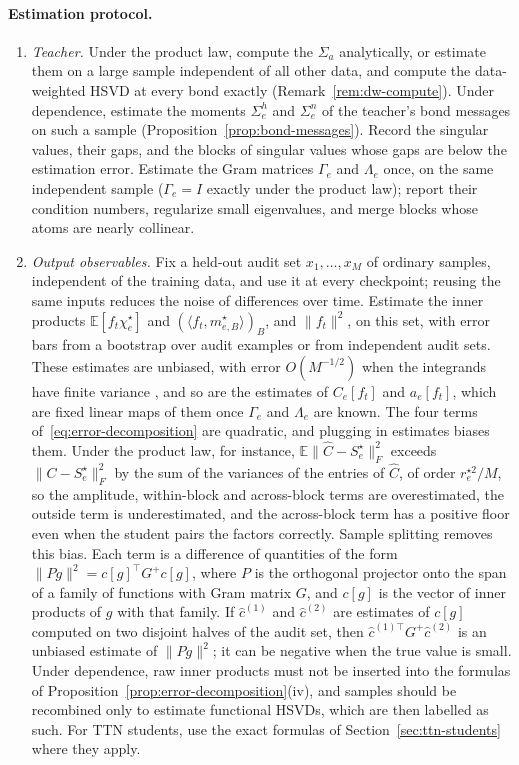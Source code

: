 \documentclass[11pt]{article}
\newcommand{\E}{\mathbb{E}}
\newcommand{\norm}[1]{\lVert #1\rVert}
\theoremstyle{definition}
\numberwithin{equation}{section}
\begin{document}
\paragraph{Estimation protocol.}
\begin{enumerate}[label=\arabic*.,nosep,leftmargin=*]
\item \emph{Teacher.} Under the product law, compute the $\Sigma_a$ analytically, or estimate them on a large sample independent of all other data, and compute the data-weighted HSVD at every bond exactly (Remark~\ref{rem:dw-compute}). Under dependence, estimate the moments $\Sigma^h_e$ and $\Sigma^n_e$ of the teacher's bond messages on such a sample (Proposition~\ref{prop:bond-messages}). Record the singular values, their gaps, and the blocks of singular values whose gaps are below the estimation error. Estimate the Gram matrices $\Gamma_e$ and $\Lambda_e$ once, on the same independent sample ($\Gamma_e=I$ exactly under the product law); report their condition numbers, regularize small eigenvalues, and merge blocks whose atoms are nearly collinear.
\item \emph{Output observables.} Fix a held-out audit set $x_1,\dots,x_M$ of ordinary samples, independent of the training data, and use it at every checkpoint; reusing the same inputs reduces the noise of differences over time. Estimate the inner products $\E[f_t\chi^\star_e]$ and $(\langle f_t,m^\star_{e,B}\rangle)_B$, and $\norm{f_t}^2$, on this set, with error bars from a bootstrap over audit examples or from independent audit sets. These estimates are unbiased, with error $O(M^{-1/2})$ when the integrands have finite variance \citep[Section~9.1]{hfl_diagonal}, and so are the estimates of $C_e[f_t]$ and $a_e[f_t]$, which are fixed linear maps of them once $\Gamma_e$ and $\Lambda_e$ are known. The four terms of~\eqref{eq:error-decomposition} are quadratic, and plugging in estimates biases them. Under the product law, for instance, $\E\norm{\hat C-S^\star_e}_F^2$ exceeds $\norm{C-S^\star_e}_F^2$ by the sum of the variances of the entries of $\hat C$, of order $r^{\star2}_e/M$, so the amplitude, within-block and across-block terms are overestimated, the outside term is underestimated, and the across-block term has a positive floor even when the student pairs the factors correctly. Sample splitting removes this bias. Each term is a difference of quantities of the form $\norm{Pg}^2=c[g]^\top G^+c[g]$, where $P$ is the orthogonal projector onto the span of a family of functions with Gram matrix $G$, and $c[g]$ is the vector of inner products of $g$ with that family. If $\hat c^{(1)}$ and $\hat c^{(2)}$ are estimates of $c[g]$ computed on two disjoint halves of the audit set, then $\hat c^{(1)\top}G^+\hat c^{(2)}$ is an unbiased estimate of $\norm{Pg}^2$; it can be negative when the true value is small. Under dependence, raw inner products must not be inserted into the formulas of Proposition~\ref{prop:error-decomposition}(iv), and samples should be recombined only to estimate functional HSVDs, which are then labelled as such. For TTN students, use the exact formulas of Section~\ref{sec:ttn-students} where they apply.

\end{enumerate}
\end{document}
